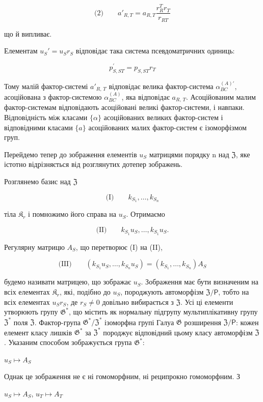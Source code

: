 \documentclass[11pt]{article}
\begin{document}
\[
\text{(2)}\qquad a'_{R,T}=a_{R,T}\frac{r_R^T r_T}{r_{RT}}
\]

що й випливає.

Елементам \(u_S' = u_S r_S\) відповідає така система псевдоматричних одиниць:

\[p_{S,ST}^{\prime}=p_{S,ST}r_{T}\]

Тому малій фактор-системі \(a'_{R,\,T}\) відповідає велика фактор-система \(\alpha^{(A)\prime}_{BC}\), асоційована з фактор-системою \(\alpha^{(A)}_{BC}\), яка відповідає \(a_{R,\,T}\). Асоційованим малим фактор-системам відповідають асоційовані великі фактор-системи, і навпаки. Відповідність між класами \(\{\alpha\}\) асоційованих великих фактор-систем і відповідними класами \(\{a\}\) асоційованих малих фактор-систем є ізоморфізмом груп.

Перейдемо тепер до зображення елементів \(u_S\) матрицями порядку n над \(\mathfrak{Z}\), яке істотно відрізняється від розглянутих дотепер зображень.

Розглянемо базис над \(\mathfrak Z\)

\[
\text{(I)}\qquad k_{S_1}, \ldots, k_{S_n}
\]

тіла \(\mathfrak K_r\) і помножимо його справа на \(u_S\). Отримаємо

\[
\text{(II)}\qquad k_{S_1}u_S, \ldots, k_{S_1}u_S.
\]

Регулярну матрицю \(A_S\), що перетворює (I) на (II),

\[
\text{(III)}\qquad (k_{S_1}u_S, \ldots, k_{S_n}u_S) = (k_{S_1}, \ldots, k_{S_n})A_S
\]

будемо називати матрицею, що зображає \(u_S\). Зображення має бути визначеним на всіх елементах \(\mathfrak K_{r}\), які, подібно до \(u_S\), породжують автоморфізм \(\mathfrak Z/\mathsf{P}\), тобто на всіх елементах \(u_Sr_S\), де \(r_S \neq 0\) довільно вибирається з \(\mathfrak Z\). Усі ці елементи утворюють групу \(\mathfrak G^*\), що містить як нормальну підгрупу мультиплікативну групу \(\mathfrak Z^*\) поля \(\mathfrak Z\). Фактор-група \(\mathfrak G^*/\mathfrak Z^*\) ізоморфна групі Галуа \(\mathfrak G\) розширення \(\mathfrak Z/\mathsf{P}\): кожен елемент класу лишків \(\mathfrak G^*\) за \(\mathfrak Z^*\) породжує відповідний цьому класу автоморфізм \(\mathfrak Z\). Указаним способом зображується група \(\mathfrak G^*\):

\(u_S \mapsto A_S\)

Однак це зображення не є ні гомоморфним, ні реципрокно гомоморфним. З

\(u_S \mapsto A_S\), \(u_T \mapsto A_T\)
\end{document}
